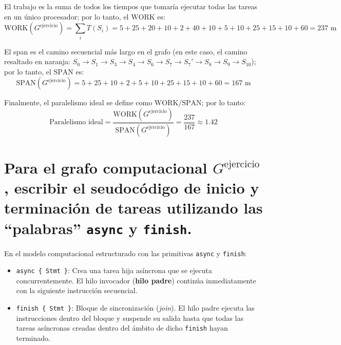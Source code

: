 \documentclass[11pt,a4paper]{article}
\begin{document}

El trabajo es la suma de todos los tiempos que tomaría ejecutar todas las tareas en un único procesador; por lo tanto, el $\text{WORK}$ es:
\[ \text{WORK}(G^{\text{ejercicio}}) = \sum_{i} T(S_i) = 5 + 25 + 20 + 10 + 2 + 40 + 10 + 5 + 10 + 25 + 15 + 10 + 60 = 237\text{ m} \]

El span es el camino secuencial más largo en el grafo (en este caso, el camino resaltado en naranja: $S_0 \to S_1 \to S_3 \to S_4 \to S_6 \to S_7 \to S_7' \to S_8 \to S_9 \to S_{10}$); por lo tanto, el $\text{SPAN}$ es:
\[ \text{SPAN}(G^{\text{ejercicio}}) = 5 + 25 + 10 + 2 + 5 + 10 + 25 + 15 + 10 + 60 = 167\text{ m} \]

Finalmente, el paralelismo ideal se define como $\text{WORK} / \text{SPAN}$; por lo tanto:
\[ \text{Paralelismo ideal} = \frac{\text{WORK}(G^{\text{ejercicio}})}{\text{SPAN}(G^{\text{ejercicio}})} = \frac{237}{167} \approx 1.42 \]
\vspace{2em}

\section{Para el grafo computacional $G^{\text{ejercicio}}$, escribir el seudocódigo de inicio y terminación de tareas utilizando las ``palabras'' \texttt{async} y \texttt{finish}.}
En el modelo computacional estructurado con las primitivas \texttt{async} y \texttt{finish}:
\begin{itemize}[noitemsep]
    \item \texttt{async \{ Stmt \}}: Crea una tarea hija asíncrona que se ejecuta concurrentemente. El hilo invocador (\textbf{hilo padre}) continúa inmediatamente con la siguiente instrucción secuencial.
    \item \texttt{finish \{ Stmt \}}: Bloque de sincronización (\textit{join}). El hilo padre ejecuta las instrucciones dentro del bloque y suspende su salida hasta que todas las tareas asíncronas creadas dentro del ámbito de dicho \texttt{finish} hayan terminado.
\end{itemize}
\end{document}
